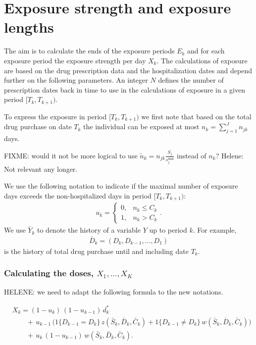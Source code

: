 \documentclass{article}
\newcommand{\lag}{N}
\newcommand{\smin}{s^{\min}}
\newcommand{\periodK}{\ensuremath{[T_k,T_{k+1})}}
\begin{document}
\section{Exposure strength and exposure lengths}
\label{sec:orgheadline7}

The aim is to calculate the ends of the exposure periods \(E_k\) and
for each exposure period the exposure strength per day \(X_k\). The
calculations of exposure are based on the drug prescription data and
the hospitalization dates and depend further on the following
parameters. An integer \(\lag\) defines the number of
prescription dates back in time to use in the calculations of exposure
in a given period \periodK.

To express the exposure in period \(\periodK\) we first note that
based on the total drug purchase on date \(T_k\) the individual can be
exposed at most \(n_k=\sum_{j=1}^J n_{jk}\) days. 

FIXME: would it not be more logical to use \(\tilde n_k = n_{jk}
\frac{S_j}{\smin_j}\) instead of \(n_k\)? Helene: Not relevant any longer.


We use the following notation to indicate if the maximal number of
exposure days exceeds the non-hospitalized days in period \periodK:
\begin{align*} 
u_{k} = \begin{cases}
0, & n_{k} \le C_k\\
1, & n_{k} > C_k
\end{cases}.
\end{align*}
We use \(\bar{Y}_{k}\) to denote the history of a variable \(Y\) up to
period \(k\). For example,
\begin{align*}
\bar{D}_{k} = \left( D_{k} ,D_{k-1}, \ldots, D_1\right)
\end{align*}
is the history of total drug purchase until and including date \(T_k\).

\subsubsection{Calculating the doses, \({X}_1, \ldots, {X}_{{K}}\)}
\label{sec:orgheadline4}

HELENE: we need to adapt the following formula to the new notations.

\begin{align*} 
&{X}_{k} = (1-u_k)\, (1-u_{k-1}) \, d_{k}^*
\\ & \qquad + \, u_{k-1}\, \Big(1\{D_{k-1}=D_{k}\} \, {z}(
\bar{S}_{k}, \bar{D}_{k}, \bar{{C}}_{k} ) + 1\{D_{k-1}\ne D_{k}\}\,
{w}( \bar{S}_{k}, \bar{D}_{k}, \bar{{C}}_{k} ) \Big) \\ & \qquad +
\,u_{k} \,(1-u_{k-1})\, {w}( \bar{S}_{k}, \bar{D}_{k},
\bar{{C}}_{k} ).
\end{align*}
\end{document}
